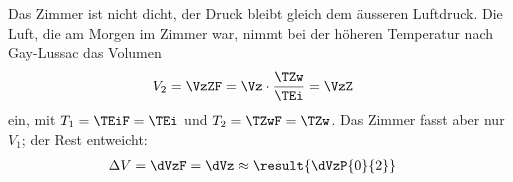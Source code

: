 Das Zimmer ist nicht dicht, der Druck bleibt gleich dem äusseren Luftdruck. Die Luft, die am Morgen im Zimmer war, nimmt bei der höheren Temperatur nach Gay-Lussac das Volumen
\begin{align}
 V_2 &= \VzZF = \Vz\cdot\frac{\TZw}{\TEi} = \VzZ
\end{align}
ein, mit $T_1 = \TEiF = \TEi$ und $T_2 = \TZwF = \TZw$. Das Zimmer fasst aber nur $V_1$; der Rest entweicht:
\begin{align}
 \Delta V &= \dVzF = \dVz \approx \result{\dVzP{0}{2}}
\end{align}
